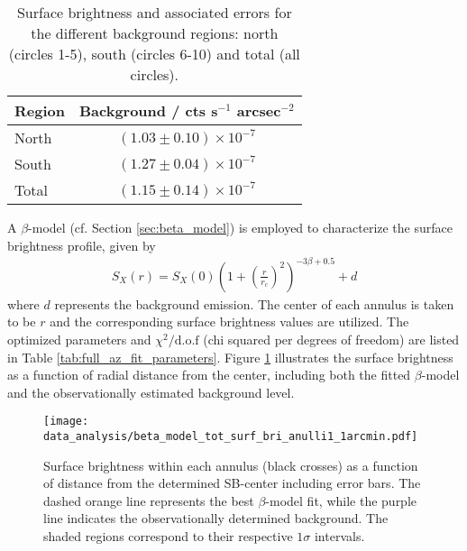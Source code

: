 %
\begin{table}[htbp]
    \centering
    \begin{tabular}{l c}
    \toprule
    Region & Background / cts s$^{-1}$ arcsec$^{-2}$ \\
    \midrule
    North & $(1.03 \pm 0.10) \times 10^{-7}$ \\
    South & $(1.27 \pm 0.04) \times 10^{-7}$ \\
    Total & $(1.15 \pm 0.14) \times 10^{-7}$ \\
    \bottomrule
    \end{tabular}
    \caption[Surface brightness and associated errors for the different background regions.]{Surface brightness and associated errors for the different background regions: north (circles 1-5), south (circles 6-10) and total (all circles).}
    \label{tab:background}
\end{table}
%
A \(\beta\)-model (cf. Section \ref{sec:beta_model}) is employed to characterize the surface brightness profile, given by
\begin{align*}
    S_X(r) = S_X(0)\left(1 + \left(\frac{r}{r_c}\right)^2\right)^{-3\beta + 0.5} + d
\end{align*}
where \(d\) represents the background emission. The center of each annulus is taken to be \(r\) and the corresponding surface brightness values are utilized. The optimized parameters and \(\chi^2 / \text{d.o.f}\) (chi squared per degrees of freedom) are listed in Table \ref{tab:full_az_fit_parameters}. Figure \ref{fig:tot_azimuthal_beta_model} illustrates the surface brightness as a function of radial distance from the center, including both the fitted \(\beta\)-model and the observationally estimated background level.
\begin{figure}[htbp]
    \centering
    \texttt{[image: data\_analysis/beta\_model\_tot\_surf\_bri\_anulli1\_1arcmin.pdf]}
    \caption[Full azimuthal surface brightness profile]{Surface brightness within each annulus (black crosses) as a function of distance from the determined SB-center including error bars. The dashed orange line represents the best \(\beta\)-model fit, while the purple line indicates the observationally determined background. The shaded regions correspond to their respective \(1\sigma\) intervals.}
    \label{fig:tot_azimuthal_beta_model}
\end{figure}
